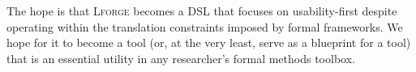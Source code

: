 The hope is that \textsc{Lforge} becomes a DSL that focuses on usability-first despite operating within the translation constraints imposed by formal frameworks. We hope for it to become a tool (or, at the very least, serve as a blueprint for a tool) that is an essential utility in any researcher's formal methods toolbox. 